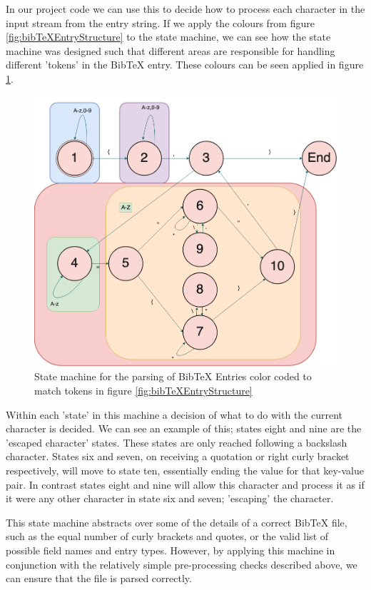 \documentclass[a4paper,11pt]{article}
\begin{document}
In our project code we can use this to decide how to process each character in the input stream from the entry string. If we apply the colours from figure \ref{fig:bibTeXEntryStructure} to the state machine, we can see how the state machine was designed such that different areas are responsible for handling different 'tokens' in the BibTeX entry. These colours can be seen applied in figure \ref{fig:stateMachineColored}.

\begin{figure}[H]
    \centering
    \includegraphics[width=\linewidth]{diagrams/dissStateMachineColorCoded.drawio.png}
    \caption{State machine for the parsing of BibTeX Entries color coded to match tokens in figure \ref{fig:bibTeXEntryStructure}}
    \label{fig:stateMachineColored}
\end{figure}

Within each 'state' in this machine a decision of what to do with the current character is decided. We can see an example of this; states eight and nine are the 'escaped character' states. These states are only reached following a backslash character. States six and seven, on receiving a quotation or right curly bracket respectively, will move to state ten, essentially ending the value for that key-value pair. In contrast states eight and nine will allow this character and process it as if it were any other character in state six and seven; 'escaping' the character.

This state machine abstracts over some of the details of a correct BibTeX file, such as the equal number of curly brackets and quotes, or the valid list of possible field names and entry types. However, by applying this machine in conjunction with the relatively simple pre-processing checks described above, we can ensure that the file is parsed correctly.
\end{document}
